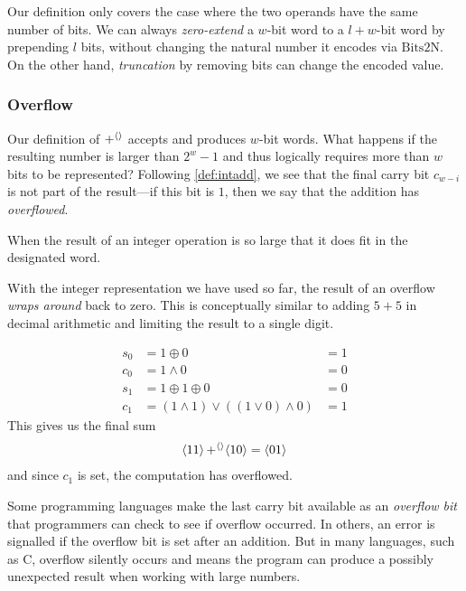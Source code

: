 Our definition only covers the case where the two operands have the
same number of bits.  We can always \emph{zero-extend} a $w$-bit word
to a $l+w$-bit word by prepending $l$ bits, without changing the
natural number it encodes via $\mathrm{Bits2N}$.  On the other hand,
\emph{truncation} by removing bits can change the encoded value.

\subsubsection{Overflow}
\label{sec:overflow}

Our definition of $\operatorname{+^{\langle\rangle}}$ accepts and produces $w$-bit words.  What
happens if the resulting number is larger than $2^{w}-1$ and thus
logically requires more than $w$ bits to be represented?  Following
\cref{def:intadd}, we see that the final carry bit $c_{w-i}$ is not
part of the result---if this bit is $1$, then we say that the addition
has \emph{overflowed}.

\begin{definition}
  When the result of an integer operation is so large that it does fit
  in the designated word.
\end{definition}

With the integer representation we have used so far, the result of an
overflow \emph{wraps around} back to zero.  This is conceptually
similar to adding $5+5$ in decimal arithmetic and limiting the result
to a single digit.

\begin{example}
  \begin{align}
    s_{0} &= 1 \oplus 0 &= 1 \\
    c_{0} &= 1 \land 0 &= 0 \\
    s_{1} &= 1 \oplus 1 \oplus 0 &= 0 \\
    c_{1} &= (1 \land 1) \lor ((1\lor 0) \land 0) &= 1
  \end{align}
  This gives us the final sum
  \begin{align}
    \langle 11 \rangle \operatorname{+^{\langle\rangle}} \langle 10 \rangle = \langle 01 \rangle
  \end{align}
  and since $c_{1}$ is set, the computation has overflowed.
\end{example}

Some programming languages make the last carry bit available as an
\emph{overflow bit} that programmers can check to see if overflow
occurred.  In others, an error is signalled if the overflow bit is set
after an addition.  But in many languages, such as C, overflow
silently occurs and means the program can produce a possibly
unexpected result when working with large numbers.

